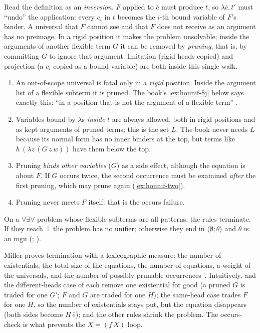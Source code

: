 Read the definition as an \emph{inversion}. $F$ applied to $\bar c$ must produce $t$, so $\lambda\bar c.\,t'$ must
\enquote{undo} the application: every $c_i$ in $t$ becomes the $i$-th bound variable of $F$'s binder. A universal
that $F$ cannot see and that $F$ does not receive as an argument has no preimage. In a rigid position it makes the
problem unsolvable; inside the arguments of another flexible term $G$ it can be removed by \emph{pruning}, that
is, by committing $G$ to ignore that argument. Imitation (rigid heads copied) and projection (a $c_i$ copied as a
bound variable) are both inside this single walk.

\begin{pitfall}
\leavevmode
\begin{enumerate}[nosep]
  \item An out-of-scope universal is fatal only in a \emph{rigid} position. Inside the argument list of a
    flexible subterm it is pruned. The book's \cref{ex:hounif-8j} below says exactly this: \enquote{in a position that
    is not the argument of a flexible term} .
  \item Variables bound by $\lambda$s \emph{inside} $t$ are always allowed, both in rigid positions and as kept
    arguments of pruned terms; this is the set $L$. The book never needs $L$ because its normal form has no inner
    binders at the top, but terms like $h\,(\lambda z\,(G\,z\,w))$ have them below the top.
  \item Pruning \emph{binds other variables} ($G$) as a side effect, although the equation is about $F$. If $G$
    occurs twice, the second occurrence must be examined \emph{after} the first pruning, which may prune again
    (\cref{ex:hounif-two}).
  \item Pruning never meets $F$ itself: that is the occurs failure.
\end{enumerate}
\end{pitfall}

\begin{theorem}\label{thm:hounif-mgu}
On a $\forall\exists\forall$ problem whose flexible subterms are all patterns, the rules terminate. If they reach $\bot$
the problem has no unifier; otherwise they end in $\langle\emptyset;\theta\rangle$ and $\theta$ is an mgu
(; \cite[Thm.~7.1, Prop.~7.3]{Miller1991}).
\end{theorem}

Miller proves termination with a lexicographic measure: the number of existentials, the total size of the
equations, the number of equations, a weight of the universals, and the number of possibly prunable
occurrences~\cite[Thm.~7.1, p.~18]{Miller1991}. Intuitively,  and the different-heads case of
 each remove one existential for good (a pruned $G$ is traded for one $G'$; $F$ and $G$ are
traded for one $H$); the same-head case trades $F$ for one $H$, so the number of existentials stays put, but the
equation disappears (both sides become $H\,\bar e$); and the other rules shrink the problem. The
occurs-check is what prevents the $X=(f\,X)$ loop.

